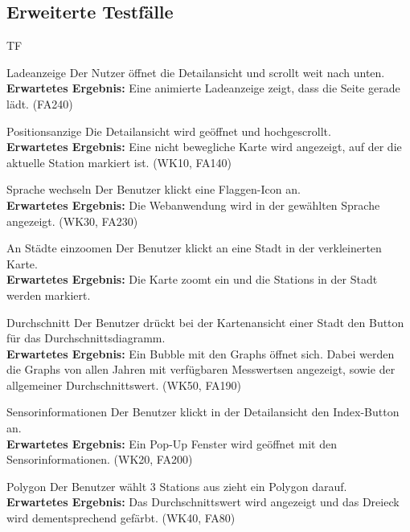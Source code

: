 \subsection{Erweiterte Testfälle}
\begin{Kriterien}{TF}

	\item[Ladeanzeige] Der Nutzer öffnet die  \gls{Detailansicht} und scrollt weit nach unten. \\ \textbf{Erwartetes Ergebnis:} Eine animierte Ladeanzeige zeigt, dass die Seite gerade lädt. (FA240)

	\item[Positionsanzige] Die Detailansicht wird geöffnet und hochgescrollt. \\ \textbf{Erwartetes Ergebnis:} Eine nicht bewegliche Karte wird angezeigt, auf der die aktuelle Station markiert ist. (WK10, FA140)
	
	\item[Sprache wechseln] Der Benutzer klickt eine Flaggen-Icon an. \\ \textbf{Erwartetes Ergebnis:} Die Webanwendung wird in der gewählten Sprache angezeigt. (WK30, FA230) 
	
	\item[An Städte einzoomen] Der Benutzer klickt an eine Stadt in der verkleinerten Karte. \\ \textbf{Erwartetes Ergebnis:} Die Karte zoomt ein und die \glspl{Station} in der Stadt werden markiert.
	
	\item[Durchschnitt] Der Benutzer drückt bei der Kartenansicht einer Stadt den Button für das Durchschnittsdiagramm. \\ \textbf{Erwartetes Ergebnis:} Ein Bubble mit den \glspl{Graph} öffnet sich. Dabei werden die \glspl{Graph} von allen Jahren mit verfügbaren \glspl{Messwert}en angezeigt, sowie der allgemeiner Durchschnittswert. (WK50, FA190)
	
	\item[Sensorinformationen] Der Benutzer klickt in der Detailansicht den Index-Button an. \\ \textbf{Erwartetes Ergebnis:}  Ein Pop-Up Fenster
wird geöffnet mit den Sensorinformationen. (WK20, FA200)

\item[Polygon] Der Benutzer wählt 3 \glspl{Station} aus zieht ein Polygon darauf. \\ \textbf{Erwartetes Ergebnis:} Das Durchschnittswert wird angezeigt und das Dreieck wird dementsprechend gefärbt. (WK40, FA80)


\end{Kriterien}
